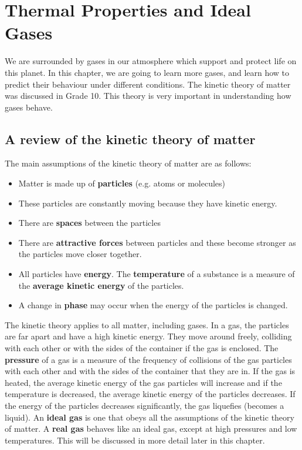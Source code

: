 \chapter{Thermal Properties and Ideal Gases}
\label{chap:gases}

We are surrounded by gases in our atmosphere which support and protect life on this planet. In this chapter, we are going to learn more gases, and learn how to predict their behaviour under different conditions. The kinetic theory of matter was discussed in Grade 10. This theory is very important in understanding how gases behave.\\


\section{A review of the kinetic theory of matter}
\label{sec:gases:kinetic theory}

The main assumptions of the kinetic theory of matter are as follows:
\begin{itemize}[noitemsep]
\item{Matter is made up of \textbf{particles} (e.g. atoms or molecules)}
\item{These particles are constantly moving because they have kinetic energy.}
\item{There are \textbf{spaces} between the particles}
\item{There are \textbf{attractive forces} between particles and these become stronger as the particles move closer together.}
\item{All particles have \textbf{energy}. The \textbf{temperature} of a substance is a measure of the \textbf{average kinetic energy} of the particles.}
\item{A change in \textbf{phase} may occur when the energy of the particles is changed.}
\end{itemize}

The kinetic theory applies to all matter, including gases. In a gas, the particles are far apart and have a high kinetic energy. They move around freely, colliding with each other or with the sides of the container if the gas is enclosed. The \textbf{pressure} of a gas is a measure of the frequency of collisions of the gas particles with each other and with the sides of the container that they are in. If the gas is heated, the average kinetic energy of the gas particles will increase and if the temperature is decreased, the average kinetic energy of the particles decreases. If the energy of the particles decreases significantly, the gas liquefies (becomes a liquid). An \textbf{ideal gas} is one that obeys all the assumptions of the kinetic theory of matter. A \textbf{real gas} behaves like an ideal gas, except at high pressures and low temperatures. This will be discussed in more detail later in this chapter.


